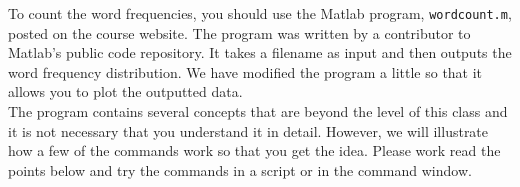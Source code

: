 \documentclass[12pt]{amsart}
\begin{document}
\noindent To count the word frequencies, you should use the Matlab program, \verb+wordcount.m+, posted on the course website.   The program was written by a contributor to Matlab's public code repository.  It takes a filename as input and then outputs the word frequency distribution.  We have modified the program a little so that it allows you to plot the outputted data. \\

\noindent The program contains several concepts that are beyond the level of this class and it is not necessary that you understand it in detail.  However, we will illustrate how a few of the commands work so that you get the idea.  Please work read the points below and try the commands in a script or in the command window.\\
\end{document}
